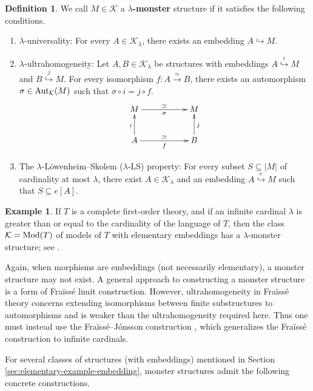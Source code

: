 \documentclass[10pt]{amsart}
\numberwithin{equation}{section}
\theoremstyle{plain}
\theoremstyle{definition}
\newtheorem{definition}[theorem]{Definition}
\newtheorem{example}[theorem]{Example}
\newcommand{\K}{\mathcal{K}}
\newcommand{\embed}{\hookrightarrow}
\newcommand{\edge}[1]{\overset{#1}{\longrightarrow}}
\newcommand{\embedge}[1]{\overset{#1}{\embed}}
\begin{document}
\begin{definition}
We call $M\in\K$ a {\bf $\lambda$-monster} structure if it satisfies the following conditions.
\begin{enumerate}
\item $\lambda$-universality:
For every $A\in\K_\lambda$, there exists an embedding $A\embed M$.
\item $\lambda$-ultrahomogeneity:
Let $A,B\in\K_\lambda$ be structures with embeddings $A\embedge{i}M$ and $B\embedge{j}M$.
For every isomorphism $f\colon A\edge{\simeq}B$, there exists an automorphism $\sigma\in{\rm Aut}_\K(M)$ such that $\sigma\circ i=j\circ f$.
\[
\xymatrix{
M\ar[rr]_\sigma^{\simeq} & & M \\
A \ar[u]^i\ar[rr]_f^{\simeq} & & B\ar[u]_j
}
\]
\item The $\lambda$-L\"owenheim--Skolem ($\lambda$-LS) property:
For every subset $S\subseteq|M|$ of cardinality at most $\lambda$, there exist $A\in\K_\lambda$ and an embedding $A\embedge{e}M$ such that $S\subseteq e[A]$.
\end{enumerate}
\end{definition}

\begin{example}
If $T$ is a complete first-order theory, and if an infinite cardinal $\lambda$ is greater than or equal to the cardinality of the language of $T$, then the class $\K={\rm Mod}(T)$ of models of $T$ with elementary embeddings has a $\lambda$-monster structure; see \cite[Definition 6.15 and Theorem 6.16]{TeZi12}.
\end{example}

Again, when morphisms are embeddings (not necessarily elementary), a monster structure may not exist.
A general approach to constructing a monster structure is a form of Fra\"iss\'e limit construction.
However, ultrahomogeneity in Fra\"iss\'e theory concerns extending isomorphisms between finite substructures to automorphisms and is weaker than the ultrahomogeneity required here.
Thus one must instead use the Fra\"iss\'e--J\'onsson construction \cite{Jon60}, which generalizes the Fra\"iss\'e construction to infinite cardinals.

For several classes of structures (with embeddings) mentioned in Section \ref{sec:elementary-example-embedding}, monster structures admit the following concrete constructions.
\end{document}
